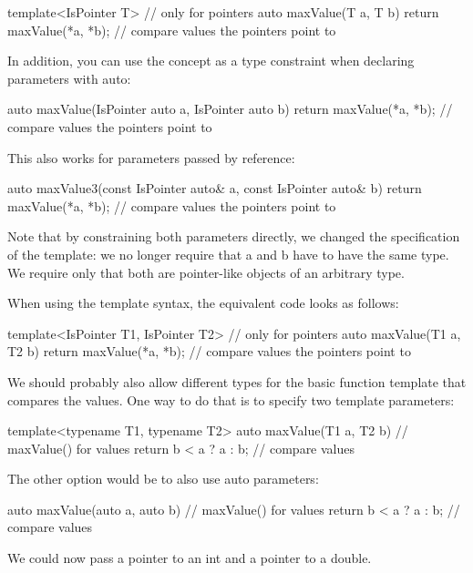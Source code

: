 \begin{cpp}
template<IsPointer T> // only for pointers
auto maxValue(T a, T b)
{
	return maxValue(*a, *b); // compare values the pointers point to
}
\end{cpp}

In addition, you can use the concept as a type constraint when declaring parameters with auto:

\begin{cpp}
auto maxValue(IsPointer auto a, IsPointer auto b)
{
	return maxValue(*a, *b); // compare values the pointers point to
}
\end{cpp}

This also works for parameters passed by reference:

\begin{cpp}
auto maxValue3(const IsPointer auto& a, const IsPointer auto& b)
{
	return maxValue(*a, *b); // compare values the pointers point to
}
\end{cpp}

Note that by constraining both parameters directly, we changed the specification of the template: we no longer require that a and b have to have the same type. We require only that both are pointer-like objects of an arbitrary type.

When using the template syntax, the equivalent code looks as follows:

\begin{cpp}
template<IsPointer T1, IsPointer T2> // only for pointers
auto maxValue(T1 a, T2 b)
{
	return maxValue(*a, *b); // compare values the pointers point to
}
\end{cpp}

We should probably also allow different types for the basic function template that compares the values. One way to do that is to specify two template parameters:

\begin{cpp}
template<typename T1, typename T2>
auto maxValue(T1 a, T2 b) // maxValue() for values
{
	return b < a ? a : b; // compare values
}
\end{cpp}

The other option would be to also use auto parameters:

\begin{cpp}
auto maxValue(auto a, auto b) // maxValue() for values
{
	return b < a ? a : b; // compare values
}
\end{cpp}

We could now pass a pointer to an int and a pointer to a double.

